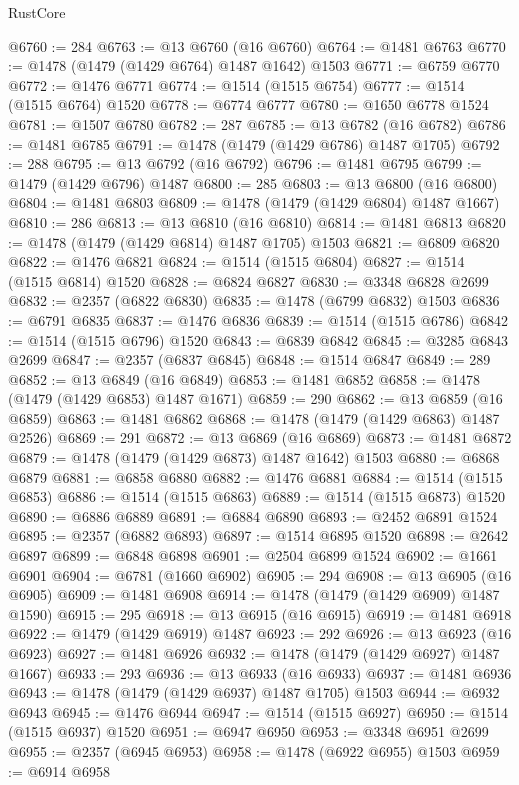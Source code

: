 \begin{lexlean}{RustCore}
\begin{coremodule}
@6760 := 284
@6763 := @13 @6760 (@16 @6760)
@6764 := @1481 @6763
@6770 := @1478 (@1479 (@1429 @6764) @1487 @1642) @1503
@6771 := @6759 @6770
@6772 := @1476 @6771
@6774 := @1514 (@1515 @6754)
@6777 := @1514 (@1515 @6764) @1520
@6778 := @6774 @6777
@6780 := @1650 @6778 @1524
@6781 := @1507 @6780
@6782 := 287
@6785 := @13 @6782 (@16 @6782)
@6786 := @1481 @6785
@6791 := @1478 (@1479 (@1429 @6786) @1487 @1705)
@6792 := 288
@6795 := @13 @6792 (@16 @6792)
@6796 := @1481 @6795
@6799 := @1479 (@1429 @6796) @1487
@6800 := 285
@6803 := @13 @6800 (@16 @6800)
@6804 := @1481 @6803
@6809 := @1478 (@1479 (@1429 @6804) @1487 @1667)
@6810 := 286
@6813 := @13 @6810 (@16 @6810)
@6814 := @1481 @6813
@6820 := @1478 (@1479 (@1429 @6814) @1487 @1705) @1503
@6821 := @6809 @6820
@6822 := @1476 @6821
@6824 := @1514 (@1515 @6804)
@6827 := @1514 (@1515 @6814) @1520
@6828 := @6824 @6827
@6830 := @3348 @6828 @2699
@6832 := @2357 (@6822 @6830)
@6835 := @1478 (@6799 @6832) @1503
@6836 := @6791 @6835
@6837 := @1476 @6836
@6839 := @1514 (@1515 @6786)
@6842 := @1514 (@1515 @6796) @1520
@6843 := @6839 @6842
@6845 := @3285 @6843 @2699
@6847 := @2357 (@6837 @6845)
@6848 := @1514 @6847
@6849 := 289
@6852 := @13 @6849 (@16 @6849)
@6853 := @1481 @6852
@6858 := @1478 (@1479 (@1429 @6853) @1487 @1671)
@6859 := 290
@6862 := @13 @6859 (@16 @6859)
@6863 := @1481 @6862
@6868 := @1478 (@1479 (@1429 @6863) @1487 @2526)
@6869 := 291
@6872 := @13 @6869 (@16 @6869)
@6873 := @1481 @6872
@6879 := @1478 (@1479 (@1429 @6873) @1487 @1642) @1503
@6880 := @6868 @6879
@6881 := @6858 @6880
@6882 := @1476 @6881
@6884 := @1514 (@1515 @6853)
@6886 := @1514 (@1515 @6863)
@6889 := @1514 (@1515 @6873) @1520
@6890 := @6886 @6889
@6891 := @6884 @6890
@6893 := @2452 @6891 @1524
@6895 := @2357 (@6882 @6893)
@6897 := @1514 @6895 @1520
@6898 := @2642 @6897
@6899 := @6848 @6898
@6901 := @2504 @6899 @1524
@6902 := @1661 @6901
@6904 := @6781 (@1660 @6902)
@6905 := 294
@6908 := @13 @6905 (@16 @6905)
@6909 := @1481 @6908
@6914 := @1478 (@1479 (@1429 @6909) @1487 @1590)
@6915 := 295
@6918 := @13 @6915 (@16 @6915)
@6919 := @1481 @6918
@6922 := @1479 (@1429 @6919) @1487
@6923 := 292
@6926 := @13 @6923 (@16 @6923)
@6927 := @1481 @6926
@6932 := @1478 (@1479 (@1429 @6927) @1487 @1667)
@6933 := 293
@6936 := @13 @6933 (@16 @6933)
@6937 := @1481 @6936
@6943 := @1478 (@1479 (@1429 @6937) @1487 @1705) @1503
@6944 := @6932 @6943
@6945 := @1476 @6944
@6947 := @1514 (@1515 @6927)
@6950 := @1514 (@1515 @6937) @1520
@6951 := @6947 @6950
@6953 := @3348 @6951 @2699
@6955 := @2357 (@6945 @6953)
@6958 := @1478 (@6922 @6955) @1503
@6959 := @6914 @6958

\end{coremodule}
\end{lexlean}
